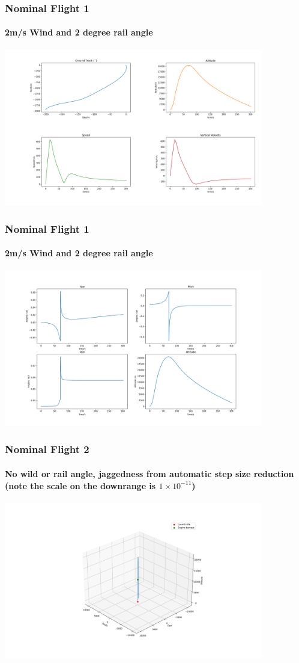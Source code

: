 \documentclass{beamer}
\begin{document}
    \begin{frame}
        \frametitle{Nominal Flight 1}
        \framesubtitle{2m/s Wind and 2 degree rail angle}
        \includegraphics[width=0.85\textwidth]{images/example2.png}
    \end{frame}
    \begin{frame}
        \frametitle{Nominal Flight 1}
        \framesubtitle{2m/s Wind and 2 degree rail angle}
        \includegraphics[width=0.85\textwidth]{images/example3.png}
    \end{frame}
    \begin{frame}
        \frametitle{Nominal Flight 2}
        \framesubtitle{No wild or rail angle, jaggedness from automatic step size reduction (note the scale on the downrange is $1\times10^{-11}$)}
        \includegraphics[width=0.85\textwidth]{images/example1a.png}
    \end{frame}
\end{document}
